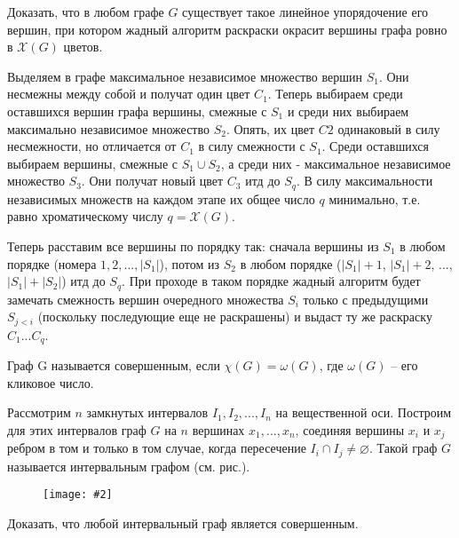 \documentclass[a4paper,12pt]{article}
\numberwithin{figure}{section}
\def\CHI{\mathcal{X}}
\newcommand\CenterFigure[2]{
	\begin{figure}[H]
		\centering
		\texttt{[image: \#2]}
	\end{figure}
}
\begin{document}
\begin{problem}
	Доказать, что в любом графе $G$ существует такое линейное упорядочение его вершин, при котором жадный алгоритм раскраски окрасит вершины графа ровно в $\CHI(G)$ цветов.
\end{problem}
\begin{solution}
	Выделяем в графе максимальное независимое множество вершин $S_1$. Они несмежны между собой и получат один цвет $C_1$. Теперь выбираем среди оставшихся вершин графа вершины, смежные с $S_1$ и среди них выбираем максимально независимое множество $S_2$. Опять, их цвет $C2$ одинаковый в силу несмежности, но отличается от $C_1$ в силу смежности с $S_1$. Среди оставшихся выбираем вершины, смежные с $S_1 \cup S_2$, а среди них - максимальное независимое множество $S_3$. Они получат новый цвет $C_3$ итд до $S_q$. В силу максимальности независимых множеств на каждом этапе их общее число $q$ минимально, т.е. равно хроматическому числу $q = \CHI(G)$.
	
	Теперь расставим все вершины по порядку так: сначала вершины из $S_1$ в любом порядке (номера $1,2,...,|S_1|$), потом из $S_2$ в любом порядке ($|S_1|+1$, $|S_1|+2$, ..., $|S_1|+|S_2|$) итд до $S_q$. При проходе в таком порядке жадный алгоритм будет замечать смежность вершин очередного множества $S_i$ только с предыдущими $S_{j<i}$ (поскольку последующие еще не раскрашены) и выдаст ту же раскраску $C_1...C_q$.
\end{solution}



\begin{problem}

	Граф G называется совершенным, если $\chi(G)=\omega(G)$, где $\omega(G)$ -- его кликовое число.

	Рассмотрим $n$ замкнутых интервалов $I_1,I_2,...,I_n$ на вещественной оси. Построим для этих интервалов граф $G$ на $n$ вершинах $x_1,...,x_n$, соединяя вершины $x_i$ и $x_j$ ребром в том и только в том случае, когда пересечение $I_i \cap I_j \neq \varnothing$. Такой граф $G$ называется интервальным графом (см. рис.). 
		\CenterFigure{8cm}{interval-graph-coloring.png}
	Доказать, что любой интервальный граф является совершенным.
\end{problem}
\end{document}
